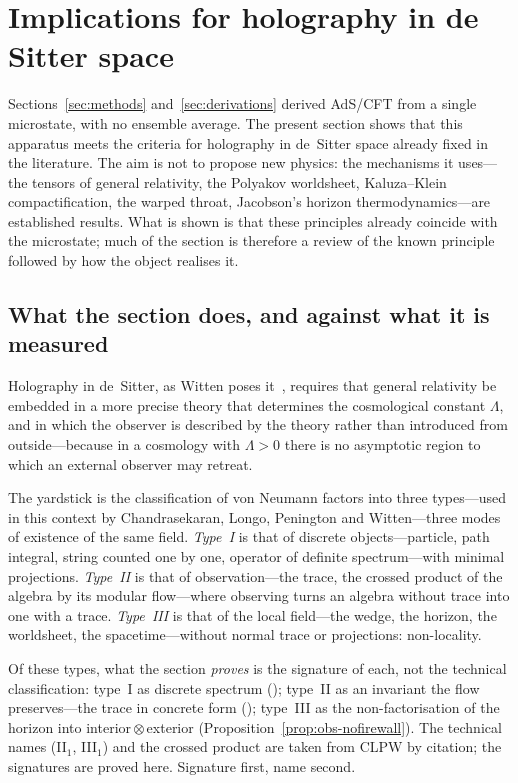 \section{Implications for holography in de Sitter space}\label{sec:implications}

Sections~\ref{sec:methods} and~\ref{sec:derivations} derived AdS/CFT from a single
microstate, with no ensemble average. The present section shows that this apparatus
meets the criteria for holography in de~Sitter space already fixed in the literature.
The aim is not to propose new physics: the mechanisms it uses---the tensors of general
relativity, the Polyakov worldsheet, Kaluza--Klein compactification, the warped throat,
Jacobson's horizon thermodynamics---are established results. What is shown is that these
principles already coincide with the microstate; much of the section is therefore a
review of the known principle followed by how the object realises it.

\subsection{What the section does, and against what it is measured}\label{ssec:noselect}

Holography in de~Sitter, as Witten poses it~\cite{Witten01dS}, requires that general relativity be embedded
in a more precise theory that determines the cosmological constant $\Lambda$, and in
which the observer is described by the theory rather than introduced from
outside---because in a cosmology with $\Lambda>0$ there is no asymptotic region to which
an external observer may retreat.

The yardstick is the classification of von Neumann factors into three types---used in
this context by Chandrasekaran, Longo, Penington and Witten---three modes of existence of
the same field. \emph{Type~I} is that of discrete objects---particle, path integral,
string counted one by one, operator of definite spectrum---with minimal projections.
\emph{Type~II} is that of observation---the trace, the crossed product of the algebra by
its modular flow---where observing turns an algebra without trace into one with a trace.
\emph{Type~III} is that of the local field---the wedge, the horizon, the worldsheet, the
spacetime---without normal trace or projections: non-locality.

Of these types, what the section \emph{proves} is the signature of each, not the
technical classification: type~I as discrete spectrum (); type~II as an invariant the flow preserves---the trace in
concrete form (); type~III as the
non-factorisation of the horizon into interior${}\otimes{}$exterior
(Proposition~\ref{prop:obs-nofirewall}). The technical names (II$_1$, III$_1$) and the
crossed product are taken from CLPW by citation; the signatures are proved here.
Signature first, name second.

